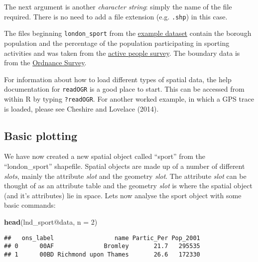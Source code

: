 \documentclass[]{article}
\newenvironment{Shaded}{}{}
\newcommand{\KeywordTok}[1]{\textcolor[rgb]{0.00,0.44,0.13}{\textbf{{#1}}}}
\newcommand{\DataTypeTok}[1]{\textcolor[rgb]{0.56,0.13,0.00}{{#1}}}
\newcommand{\DecValTok}[1]{\textcolor[rgb]{0.25,0.63,0.44}{{#1}}}
\newcommand{\NormalTok}[1]{{#1}}
\begin{document}
The next argument is another \emph{character string}: simply the name of
the file required. There is no need to add a file extension (e.g.
\texttt{.shp}) in this case.

The files beginning \texttt{london\_sport} from the
\href{http://spatial.ly/wp-content/uploads/2013/12/spatialggplot.zip}{example
dataset} contain the borough population and the percentage of the
population participating in sporting activities and was taken from the
\href{http://data.london.gov.uk/datastore/package/active-people-survey-kpi-data-borough}{active
people survey}. The boundary data is from the
\href{http://www.ordnancesurvey.co.uk/oswebsite/opendata/}{Ordnance
Survey}.

For information about how to load different types of spatial data, the
help documentation for \texttt{readOGR} is a good place to start. This
can be accessed from within R by typing \texttt{?readOGR}. For another
worked example, in which a GPS trace is loaded, please see Cheshire and
Lovelace (2014).

\subsection{Basic plotting}\label{basic-plotting}

We have now created a new spatial object called ``sport'' from the
``london\_sport'' shapefile. Spatial objects are made up of a number of
different \emph{slots}, mainly the attribute \emph{slot} and the
geometry \emph{slot}. The attribute \emph{slot} can be thought of as an
attribute table and the geometry \emph{slot} is where the spatial object
(and it's attributes) lie in space. Lets now analyse the sport object
with some basic commands:

\begin{Shaded}
\begin{Highlighting}[]
\KeywordTok{head}\NormalTok{(lnd_sport@data, }\DataTypeTok{n =} \DecValTok{2}\NormalTok{)}
\end{Highlighting}
\end{Shaded}

\begin{verbatim}
##   ons_label                 name Partic_Per Pop_2001
## 0      00AF              Bromley       21.7   295535
## 1      00BD Richmond upon Thames       26.6   172330
\end{verbatim}

\begin{Shaded}
\end{Shaded}
\end{document}
